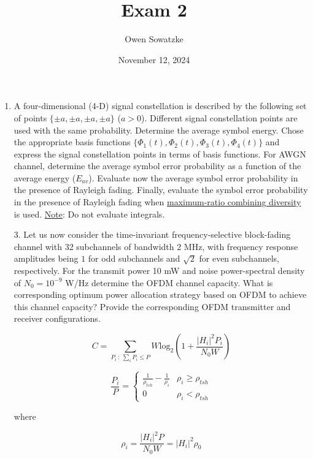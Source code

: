 \documentclass[fleqn]{article}
\title{Exam 2}
\author{Owen Sowatzke}
\date{November 12, 2024}
\newcommand{\zerodisplayskip}{
	\setlength{\abovedisplayskip}{0pt}%
	\setlength{\belowdisplayskip}{0pt}%
	\setlength{\abovedisplayshortskip}{0pt}%
	\setlength{\belowdisplayshortskip}{0pt}%
	\setlength{\mathindent}{0pt}}
\begin{document}
	\offinterlineskip
	\setlength{\lineskip}{12pt}
	\zerodisplayskip
	\maketitle
	
	\begin{enumerate}
		\item A four-dimensional (4-D) signal constellation is described by the following set of points $\{\pm a, \pm a, \pm a, \pm a\}$ ($a>0$). Different signal constellation points are used with the same probability. Determine the average symbol energy. Chose the appropriate basis functions $\{\Phi_1(t), \Phi_2(t), \Phi_3(t), \Phi_4(t)\}$ and express the signal constellation points in terms of basis functions. For AWGN channel, determine the average symbol error probability as a function of the average energy ($E_{av}$). Evaluate now the average symbol error probability in the presence of Rayleigh fading. Finally, evaluate the symbol error probability in the presence of Rayleigh fading when \underline{maximum-ratio combining diversity} is used. \underline{Note}: Do not evaluate integrals.

		\item[3.] Let us now consider the time-invariant frequency-selective block-fading channel with 32 subchannels of bandwidth 2 MHz, with frequency response amplitudes being $1$ for odd subchannels and $\sqrt{2}$ for even subchannels, respectively. For the transmit power 10 mW and noise power-spectral density of $N_0=10^{-9}$ W/Hz determine the OFDM channel capacity. What is corresponding optimum power allocation strategy based on OFDM to achieve this channel capacity? Provide the corresponding OFDM transmitter and receiver configurations.
		
		\begin{equation*}
			C = \underset{P_i \ :\ \sum_i{P_i \leq P}}{\sum}{W\text{log}_2\left(1 + \frac{|H_i|^2P_i}{N_0W}\right)}
		\end{equation*}
		
		\begin{equation*}
			\frac{P_i}{P} = \begin{cases}
				\frac{1}{\rho_{tsh}} - \frac{1}{\rho_i} & \rho_i \geq \rho_{tsh} \\
				0 & \rho_i < \rho_{tsh}
			\end{cases}
		\end{equation*}
		
		where
		
		\begin{equation*}
			\rho_i = \frac{|H_i|^2P}{N_0W} = |H_i|^2\rho_0 
		\end{equation*}
		

\end{enumerate}
\end{document}
